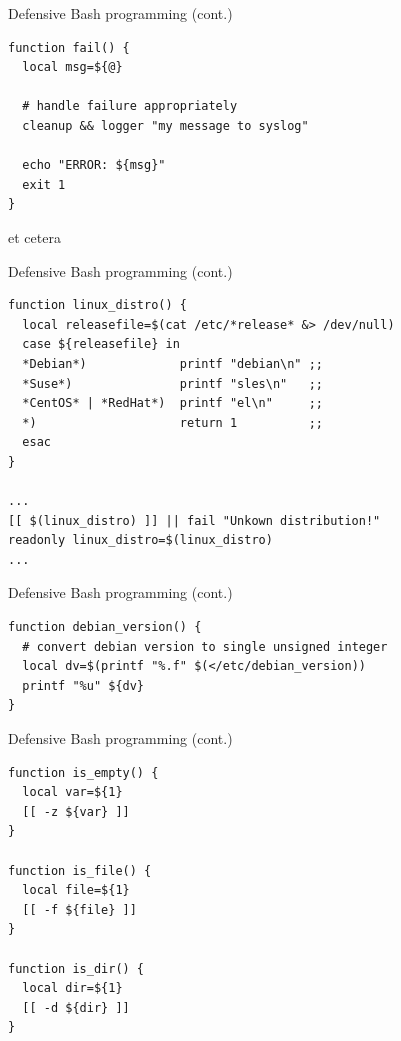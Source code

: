 \begin{frame}[fragile]{Defensive Bash programming (cont.)}

\begin{verbatim}
function fail() {
  local msg=${@}

  # handle failure appropriately
  cleanup && logger "my message to syslog"

  echo "ERROR: ${msg}"
  exit 1
}
\end{verbatim}

et cetera

\end{frame}

\begin{frame}[fragile]{Defensive Bash programming (cont.)}

\begin{verbatim}
function linux_distro() {
  local releasefile=$(cat /etc/*release* &> /dev/null)
  case ${releasefile} in
  *Debian*)             printf "debian\n" ;;
  *Suse*)               printf "sles\n"   ;;
  *CentOS* | *RedHat*)  printf "el\n"     ;;
  *)                    return 1          ;;
  esac
}

...
[[ $(linux_distro) ]] || fail "Unkown distribution!"
readonly linux_distro=$(linux_distro)
...
\end{verbatim}

\end{frame}

\begin{frame}[fragile]{Defensive Bash programming (cont.)}

\begin{verbatim}
function debian_version() {
  # convert debian version to single unsigned integer
  local dv=$(printf "%.f" $(</etc/debian_version))
  printf "%u" ${dv}
}
\end{verbatim}

\end{frame}

\begin{frame}[fragile]{Defensive Bash programming (cont.)}

\begin{verbatim}
function is_empty() {
  local var=${1}
  [[ -z ${var} ]]
}

function is_file() {
  local file=${1}
  [[ -f ${file} ]]
}

function is_dir() {
  local dir=${1}
  [[ -d ${dir} ]]
}
\end{verbatim}

\end{frame}

